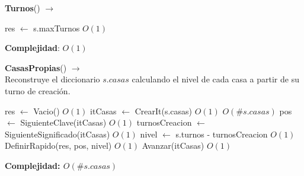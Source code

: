 \begin{Algoritmos}
\begin{algorithm}[H]{\textbf{Turnos}() $\to$ }
\begin{algorithmic}[1]
    \State res $\gets$ s.maxTurnos \Comment $O(1)$
\end{algorithmic}
\textbf{Complejidad}: $O(1)$
\end{algorithm}

\begin{algorithm}[H]{\textbf{CasasPropias}() $\to$ }
\\ {\small Reconstruye el diccionario $s.casas$ calculando el nivel de cada casa a partir de su turno de creación.}
\begin{algorithmic}[1]
    \State res $\gets$ Vacio() \Comment $O(1)$
    \State itCasas $\gets$ CrearIt(s.casas) \Comment $O(1)$
     \Comment $O(\#s.casas)$
        \State pos $\gets$ SiguienteClave(itCasas) \Comment $O(1)$
        \State turnosCreacion $\gets$ SiguienteSignificado(itCasas) \Comment $O(1)$
        \State nivel $\gets$ s.turnos - turnosCreacion \Comment $O(1)$
        \State DefinirRapido(res, pos, nivel) \Comment $O(1)$
        \State Avanzar(itCasas) \Comment $O(1)$
    \EndWhile
\end{algorithmic}
\textbf{Complejidad: $O(\#s.casas)$}
\end{algorithm}


\end{Algoritmos}
